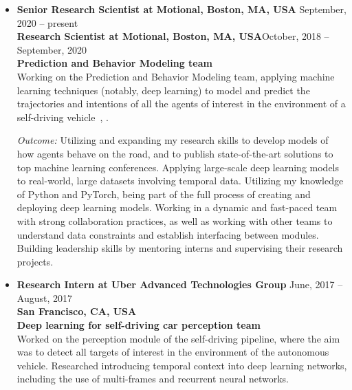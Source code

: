 \documentclass[10pt,letterpaper]{article}
\newcommand{\thing}[2]{{#1} \hfill {#2}}
\begin{document}
\begin{itemize}%

\item \thing{\bf Senior Research Scientist at Motional, Boston, MA, USA}{September, 2020 -- present}\\
 	{\bf Research Scientist at Motional, Boston, MA, USA}\hfill{October, 2018  --  September, 2020}\vspace{0.5em}\\
	{\bf Prediction and Behavior Modeling team}\vspace{0.5em}\\
      	Working on the Prediction and Behavior Modeling team, applying machine learning techniques (notably, deep learning) to model and predict the trajectories and intentions of all the agents of interest in the environment of a self-driving vehicle~\cite{grigore2020covernet}, \cite{grigore2020self_driving_domain_knowledge}.
	
	{\it Outcome:} Utilizing and expanding my research skills to develop models of how agents behave on the road, and to publish state-of-the-art solutions to top machine learning conferences. Applying large-scale deep learning models to real-world, large datasets involving temporal data. Utilizing my knowledge of Python and PyTorch, being part of the full process of creating and deploying deep learning models. Working in a dynamic and fast-paced team with strong collaboration practices, as well as working with other teams to understand data constraints and establish interfacing between modules. Building leadership skills by mentoring interns and supervising their research projects.
	
\item \thing{\bf Research Intern at Uber Advanced Technologies Group}{June, 2017 -- August, 2017}\\
        {\bf San Francisco, CA, USA} \\
        {\bf Deep learning for self-driving car perception team}\vspace{0.5em}\\
        Worked on the perception module of the self-driving pipeline, where the aim was to detect all targets of interest in the environment of the autonomous vehicle. Researched introducing temporal context into deep learning networks, including the use of multi-frames and recurrent neural networks.
	

\end{itemize}
\end{document}
